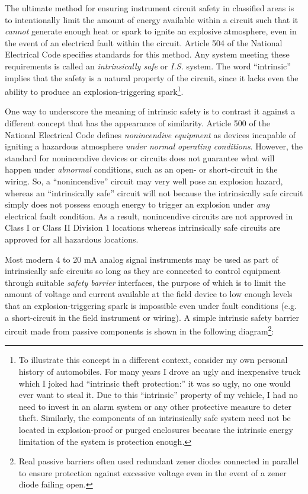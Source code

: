 \vskip 10pt

The ultimate method for ensuring instrument circuit safety in classified areas is to intentionally limit the amount of energy available within a circuit such that it \textit{cannot} generate enough heat or spark to ignite an explosive atmosphere, even in the event of an electrical fault within the circuit.  Article 504 of the National Electrical Code specifies standards for this method.  Any system meeting these requirements is called an \textit{intrinsically safe} or \textit{I.S.} system.  The word ``intrinsic'' implies that the safety is a natural property of the circuit, since it lacks even the ability to produce an explosion-triggering spark\footnote{To illustrate this concept in a different context, consider my own personal history of automobiles.  For many years I drove an ugly and inexpensive truck which I joked had ``intrinsic theft protection:'' it was so ugly, no one would ever want to steal it.  Due to this ``intrinsic'' property of my vehicle, I had no need to invest in an alarm system or any other protective measure to deter theft.  Similarly, the components of an intrinsically safe system need not be located in explosion-proof or purged enclosures because the intrinsic energy limitation of the system is protection enough.}.    

One way to underscore the meaning of intrinsic safety is to contrast it against a different concept that has the appearance of similarity.  Article 500 of the National Electrical Code defines \textit{nonincendive equipment} as devices incapable of igniting a hazardous atmosphere \textit{under normal operating conditions}.  However, the standard for nonincendive devices or circuits does not guarantee what will happen under \textit{abnormal} conditions, such as an open- or short-circuit in the wiring.  So, a ``nonincendive'' circuit may very well pose an explosion hazard, whereas an ``intrinsically safe'' circuit will not because the intrinsically safe circuit simply does not possess enough energy to trigger an explosion under \textit{any} electrical fault condition.  As a result, nonincendive circuits are not approved in Class I or Class II Division 1 locations whereas intrinsically safe circuits are approved for all hazardous locations.  

\vskip 10pt

Most modern 4 to 20 mA analog signal instruments may be used as part of intrinsically safe circuits so long as they are connected to control equipment through suitable \textit{safety barrier} interfaces, the purpose of which is to limit the amount of voltage and current available at the field device to low enough levels that an explosion-triggering spark is impossible even under fault conditions (e.g. a short-circuit in the field instrument or wiring).  A simple intrinsic safety barrier circuit made from passive components is shown in the following diagram\footnote{Real passive barriers often used redundant zener diodes connected in parallel to ensure protection against excessive voltage even in the event of a zener diode failing open.}:     

